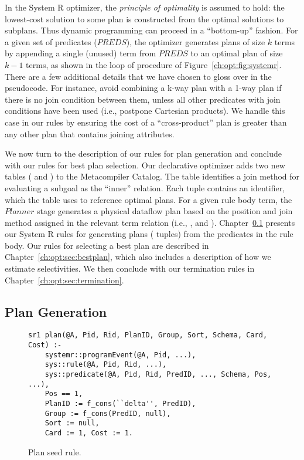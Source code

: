 In the System R optimizer, the {\em principle of optimality} is assumed to
hold: the lowest-cost solution to some plan is constructed from the optimal
solutions to subplans.  Thus dynamic programming can proceed in a ``bottom-up''
fashion.  For a given set of predicates ($PREDS$), the optimizer generates
plans of size $k$ terms by appending a single (unused) term from $PREDS$ to an
optimal plan of size $k-1$ terms, as shown in the loop of  procedure
of Figure~\ref{ch:opt:fig:systemr}.  There are a few additional details that we
have chosen to gloss over in the pseudocode.  For instance, avoid combining a
k-way plan with a 1-way plan if there is no join condition between them, unless
all other predicates with join conditions have been used (i.e., postpone
Cartesian products).  We handle this case in our \OVERLOG rules by ensuring the
cost of a ``cross-product'' plan is greater than any other plan that contains
joining attributes.

We now turn to the description of our \OVERLOG rules for plan generation and
conclude with our rules for best plan selection.  Our declarative optimizer
adds two new tables ( and ) to the Metacompiler Catalog.
The  table identifies a join method for evaluating a subgoal as the
``inner'' relation.  Each  tuple contains an identifier, which the
 table uses to reference optimal plans.  For a given rule body
term, the $Planner$ stage generates a physical dataflow plan based on the
position and join method assigned in the relevant term relation (i.e.,
,  and ).
Chapter~\ref{ch:opt:sec:plangen} presents our System R rules for generating
plans ( tuples) from the predicates in the rule body.  Our rules for
selecting a best plan are described in Chapter~\ref{ch:opt:sec:bestplan}, which
also includes a description of how we estimate selectivities.  We then conclude
with our termination rules in Chapter~\ref{ch:opt:sec:termination}.

\subsection{Plan Generation}
\label{ch:opt:sec:plangen}

\begin{figure*}
\ssp
\centering
\begin{lstlisting}
sr1 plan(@A, Pid, Rid, PlanID, Group, Sort, Schema, Card, Cost) :-
    systemr::programEvent(@A, Pid, ...),
    sys::rule(@A, Pid, Rid, ...),
    sys::predicate(@A, Pid, Rid, PredID, ..., Schema, Pos, ...),
    Pos == 1,
    PlanID := f_cons(``delta'', PredID),
    Group := f_cons(PredID, null),
    Sort := null,
    Card := 1, Cost := 1.
\end{lstlisting}
\caption{\label{ch:opt:fig:planseed}Plan seed rule.}
\end{figure*}


